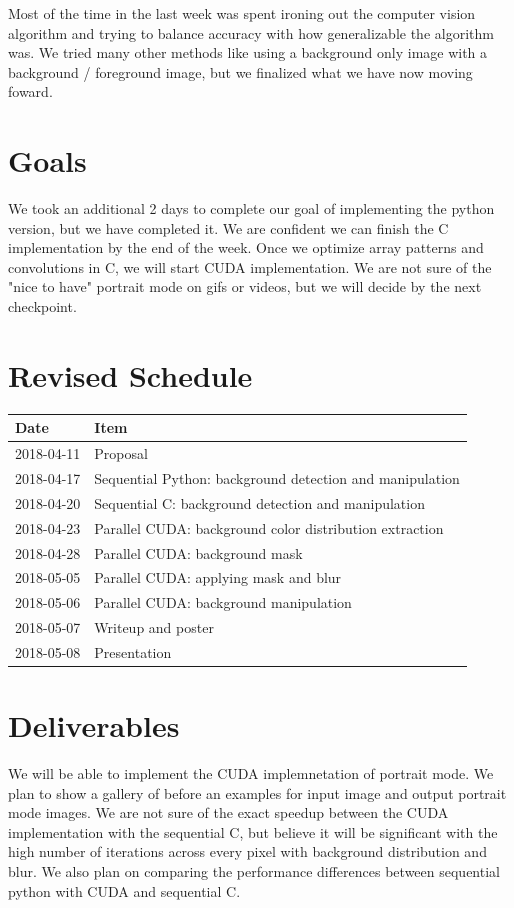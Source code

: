 \documentclass[12pt]{article}
\begin{document}
Most of the time in the last week was spent ironing out the computer vision
algorithm and trying to balance accuracy with how generalizable the algorithm
was. We tried many other methods like using a background only image with a
background / foreground image, but we finalized what we have now moving foward.

\section{Goals}

We took an additional 2 days to complete our goal of implementing the python
version, but we have completed it. We are confident we can finish the C
implementation by the end of the week. Once we optimize array patterns and
convolutions in C, we will start CUDA implementation. We are not sure of the
"nice to have" portrait mode on gifs or videos, but we will decide by the next
checkpoint.

\section{Revised Schedule}

\begin{tabular}{l|l}
    Date & Item \\
    \hline
    2018-04-11 & Proposal \\
    2018-04-17 & Sequential Python: background detection and manipulation \\
    2018-04-20 & Sequential C: background detection and manipulation \\
    2018-04-23 & Parallel CUDA: background color distribution extraction \\
    2018-04-28 & Parallel CUDA: background mask \\
    2018-05-05 & Parallel CUDA: applying mask and blur \\
    2018-05-06 & Parallel CUDA: background manipulation \\
    2018-05-07 & Writeup and poster \\
    2018-05-08 & Presentation
\end{tabular}

\section{Deliverables}

We will be able to implement the CUDA implemnetation of portrait mode. We plan
to show a gallery of before an examples for input image and output portrait
mode images. We are not sure of the exact speedup between the CUDA
implementation with the sequential C, but believe it will be significant with
the high number of iterations across every pixel with background distribution
and blur. We also plan on comparing the performance differences between
sequential python with CUDA and sequential C.
\end{document}
